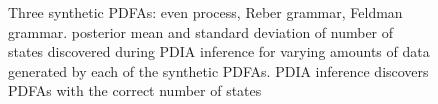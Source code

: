 \begin{figure}[htbp]
\label{fig:synthetic_grammar_and_synth_results}
\caption{Three synthetic PDFAs:  even process,  Reber grammar,  Feldman grammar.   posterior mean and standard deviation of number of states discovered during PDIA inference for varying amounts of data generated by each of the synthetic PDFAs.  PDIA inference discovers PDFAs with the correct number of states}
\end{figure}